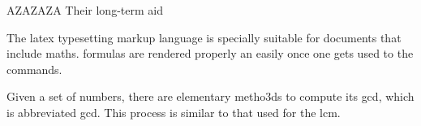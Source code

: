 \documentclass[a4paper,11pt]{report} %
\begin{document}

 
\begin{spacing}{1.2}
\setcounter{page}{1}
\tableofcontents 
\end{spacing} 
\newpage





% 

\newpage
AZAZAZA
Their long-term aid ~\cite{Haggarty:01} ~\cite{Haggarty:02}

The \Gls{latex} typesetting markup language is specially suitable 
for documents that include \gls{maths}. \Glspl{formula} are 
rendered properly an easily once one gets used to the commands.
 
Given a set of numbers, there are elementary metho3ds to compute 
its \acrlong{gcd}, which is abbreviated \acrshort{gcd}. This 
process is similar to that used for the \acrfull{lcm}.

\renewcommand{\bibname}{References}



\end{document}
